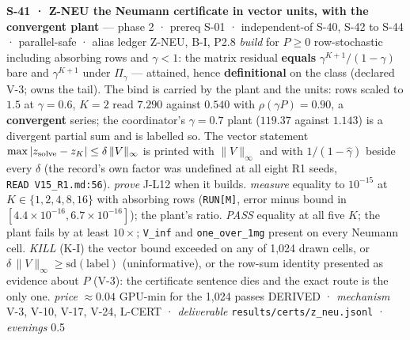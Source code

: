\documentclass[11pt,a4paper]{article}
\theoremstyle{plain}
\theoremstyle{definition}
\theoremstyle{remark}
\begin{document}
\textbf{S-41 · Z-NEU the Neumann certificate in vector units, with the
convergent plant} --- phase 2 · prereq S-01 · independent-of S-40, S-42
to S-44 · parallel-safe · alias ledger Z-NEU, B-I, P2.8 \emph{build} for
\(P\ge0\) row-stochastic including absorbing rows and \(\gamma<1\): the
matrix residual \textbf{equals} \(\gamma^{K+1}/(1-\gamma)\) bare and
\(\gamma^{K+1}\) under \(\Pi_\gamma\) --- attained, hence
\textbf{definitional} on the class (declared V-3;
\citep{meyer-2000-matrix} owns the tail). The bind is carried by the
plant and the units: rows scaled to \(1.5\) at \(\gamma=0.6\), \(K=2\)
read \(7.290\) against \(0.540\) with \(\rho(\gamma P)=0.90\), a
\textbf{convergent} series; the coordinator's \(\gamma=0.7\) plant
(\(119.37\) against \(1.143\)) is a divergent partial sum and is
labelled so. The vector statement
\(\max|z_{\rm solve}-z_K|\le\delta\,\|V\|_\infty\) is printed with
\(\|V\|_\infty\) and with \(1/(1-\hat\gamma)\) beside every \(\delta\)
(the record's own factor was undefined at all eight R1 seeds,
\texttt{READ\ V15\_R1.md:56}). \emph{prove} J-L12 when it builds.
\emph{measure} equality to \(10^{-15}\) at \(K\in\{1,2,4,8,16\}\) with
absorbing rows (\texttt{RUN{[}M{]}}, error minus bound in
\([4.4\times10^{-16}, 6.7\times10^{-16}]\)); the plant's ratio.
\emph{PASS} equality at all five \(K\); the plant fails by at least
\(10\times\); \texttt{V\_inf} and \texttt{one\_over\_1mg} present on
every Neumann cell. \emph{KILL} (K-I) the vector bound exceeded on any
of 1,024 drawn cells, or
\(\delta\,\|V\|_\infty\ge\mathrm{sd}(\text{label})\) (uninformative), or
the row-sum identity presented as evidence about \(P\) (V-3): the
certificate sentence dies and the exact route is the only one.
\emph{price} \(\approx0.04\) GPU-min for the 1,024 passes DERIVED ·
\emph{mechanism} V-3, V-10, V-17, V-24, L-CERT · \emph{deliverable}
\texttt{results/certs/z\_neu.jsonl} · \emph{evenings} 0.5
\end{document}
